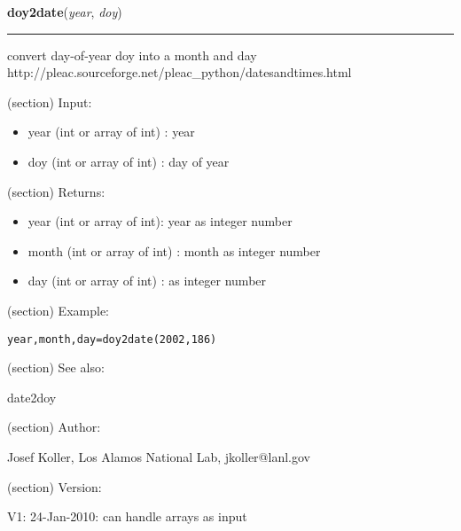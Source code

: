     \vspace{0.5ex}

\hspace{.8\funcindent}\begin{boxedminipage}{\funcwidth}

    \raggedright \textbf{doy2date}(\textit{year}, \textit{doy})

    \vspace{-1.5ex}

    \rule{\textwidth}{0.5\fboxrule}
\setlength{\parskip}{2ex}
    convert day-of-year doy into a month and day 
    http://pleac.sourceforge.net/pleac\_python/datesandtimes.html

    (section) Input:

      \begin{itemize}
      \setlength{\parskip}{0.6ex}
        \item year (int or array of int) : year

        \item doy (int or array of int) : day of year

      \end{itemize}

    (section) Returns:

      \begin{itemize}
      \setlength{\parskip}{0.6ex}
        \item year (int or array of int): year as integer number

        \item month (int or array of int) : month as integer number

        \item day (int or array of int) : as integer number

      \end{itemize}

    (section) Example:

\begin{alltt}
\pysrcprompt{{\textgreater}{\textgreater}{\textgreater} }year, month, day = doy2date(2002, 186)\end{alltt}
    (section) See also:

      date2doy

    (section) Author:

      Josef Koller, Los Alamos National Lab, jkoller@lanl.gov

    (section) Version:

      V1: 24-Jan-2010: can handle arrays as input

\setlength{\parskip}{1ex}
    \end{boxedminipage}



